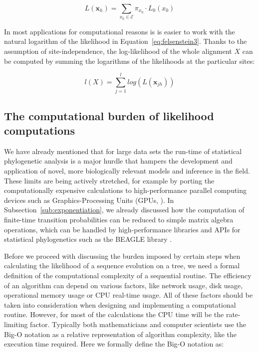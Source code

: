\begin{equation}
L(\mathbf{x}_{h})=\underset{x_{0}\in\mathcal{E}}{\sum}\pi_{x_{0}}\cdot L_{0}(x_{0})
\label{eq:felsenstein3}
\end{equation}

\noindent
In most applications for computational reasons is is easier to work with the natural logarithm of the likelihood in Equation~\ref{eq:felsenstein3}.
Thanks to the assumption of site-independence, the log-likelihood of the whole alignment $X$ can be computed by summing the logarithms of the likelihoods at the particular sites:

\begin{equation}
l(X)=\underset{j=1}{\overset{l}{\sum}}log\left(L(\mathbf{x}_{jh})\right)
\label{eq:loglikelihood}
\end{equation}

\subsection{The computational burden of likelihood computations\label{sub:mlburden}}

We have already mentioned that for large data sets the run-time of statistical phylogenetic analysis is a major hurdle that hampers the development and application of novel, more biologically relevant models and inference in the field.
These limits are being actively stretched, for example by porting the computationally expensive calculations to high-performance parallel computing devices such as Graphics-Processing Units (GPUs, \cite{Nickolls2008}).
In Subsection~\ref{sub:exponentiation}, we already discussed how the computation of finite-time transition probabilities can be reduced to simple matrix algebra operations, which can be handled by high-performance libraries and APIs for statistical phylogenetics such as the BEAGLE library \citep{Ayres2012, Suchard2009}. 

Before we proceed with discussing the burden imposed by certain steps when calculating the likelihood of a sequence evolution on a tree, we need a formal definition of the computational complexity of a sequential routine.
The efficiency of an algorithm can depend on various factors, like network usage, disk usage, operational memory usage or CPU real-time usage.
All of these factors should be taken into consideration when designing and implementing a computational routine. 
However, for most of the calculations the CPU time will be the rate-limiting factor.
Typically both mathematicians and computer scientists use the Big-O notation as a relative representation of algorithm complexity, like the execution time required.
Here we formally define the Big-O notation as:

